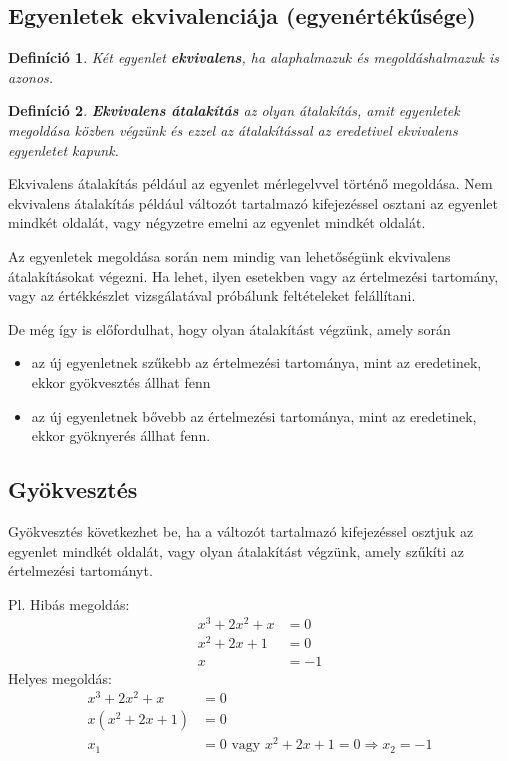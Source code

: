 \documentclass[12pt,a4paper]{article}
\newtheorem{definition}{Definíció} [section]
\begin{document}
\subsection{Egyenletek ekvivalenciája (egyenértékűsége)}

\begin{definition}
Két egyenlet \textbf{ekvivalens}, ha alaphalmazuk és megoldáshalmazuk is azonos.
\end{definition}

\begin{definition}
\textbf{Ekvivalens átalakítás} az olyan átalakítás, amit egyenletek megoldása közben végzünk és ezzel az átalakítással az eredetivel ekvivalens egyenletet kapunk.
\end{definition}

Ekvivalens átalakítás például az egyenlet mérlegelvvel történő megoldása. Nem ekvivalens átalakítás például változót tartalmazó kifejezéssel osztani az egyenlet mindkét oldalát, vagy négyzetre emelni az egyenlet mindkét oldalát.

Az egyenletek megoldása során nem mindig van lehetőségünk ekvivalens átalakításokat végezni. Ha lehet, ilyen esetekben vagy az értelmezési tartomány, vagy az értékkészlet vizsgálatával próbálunk feltételeket felállítani.

De még így is előfordulhat, hogy olyan átalakítást végzünk, amely során
\begin{itemize}
\item az új egyenletnek szűkebb az értelmezési tartománya, mint az eredetinek, ekkor gyökvesztés állhat fenn
\item az új egyenletnek bővebb az értelmezési tartománya, mint az eredetinek, ekkor gyöknyerés állhat fenn.
\end{itemize}

\subsection{Gyökvesztés}
Gyökvesztés következhet be, ha a változót tartalmazó kifejezéssel osztjuk az egyenlet mindkét oldalát, vagy olyan átalakítást végzünk, amely szűkíti az értelmezési tartományt.

Pl. Hibás megoldás:
\begin{align*}
x^3+2x^2+x&=0 \\
x^2+2x+1&=0 \\
x&= -1
\end{align*}
Helyes megoldás:
\begin{align*}
x^3+2x^2+x&=0 \\
x(x^2+2x+1)&=0 \\
x_1&= 0 \text{ vagy } x^2+2x+1=0 \Rightarrow x_2=-1
\end{align*}
\end{document}
